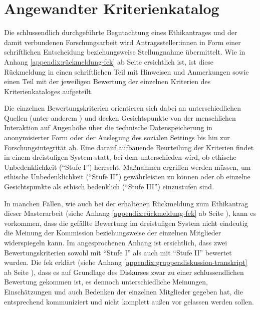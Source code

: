 \documentclass[a4paper,12pt,twoside]{scrreprt}
\begin{document}
\section{Angewandter Kriterienkatalog}
\label{sec:angewandter-kriterienkatalog}

Die schlussendlich durchgeführte Begutachtung eines Ethikantrages und der damit verbundenen Forschungsarbeit wird Antragssteller:innen in Form einer schriftlichen Entscheidung beziehungsweise Stellungnahme übermittelt. \cite[4]{forschungsethik-kommission_der_fachhochschule_vorarlberg_verfahrensordnung_2020} Wie in Anhang \ref{appendix:rückmeldung-fek} ab Seite \pageref{appendix:rückmeldung-fek} ersichtlich ist, ist diese Rückmeldung in einen schriftlichen Teil mit Hinweisen und Anmerkungen sowie einen Teil mit der jeweiligen Bewertung der einzelnen Kriterien des Kriterienkataloges aufgeteilt.

Die einzelnen Bewertungskriterien orientieren sich dabei an unterschiedlichen Quellen (unter anderem \cite{manzeschke_meestar_2015, marckmann_was_2000, schuchter_care_2018}) und decken Gesichtspunkte von der menschlichen Interaktion auf Augenhöhe über die technische Datenspeicherung in anonymisierter Form oder der Auslegung des sozialen Settings bis hin zur Forschungsintegrität ab. Eine darauf aufbauende Beurteilung der Kriterien findet in einem dreistufigen System statt, bei dem unterschieden wird, ob ethische Unbedenklichkeit (\enquote{Stufe I}) herrscht, Maßnahmen ergriffen werden müssen, um ethische Unbedenklichkeit (\enquote{Stufe II}) gewährleisten zu können oder ob einzelne Gesichtspunkte als ethisch bedenklich (\enquote{Stufe III}) einzustufen sind. \cite[1]{forschungsethik-kommission_der_fachhochschule_vorarlberg_kriterienkatalog_2021}

\medskip

In manchen Fällen, wie auch bei der erhaltenen Rückmeldung zum Ethikantrag dieser Masterarbeit (siehe Anhang \ref{appendix:rückmeldung-fek} ab Seite \pageref{appendix:rückmeldung-fek}), kann es vorkommen, dass die gefällte Bewertung im dreistufigen System nicht eindeutig die Meinung der Kommission beziehungsweise der einzelnen Mitglieder widerspiegeln kann. Im angesprochenen Anhang ist ersichtlich, dass zwei Bewertungskriterien sowohl mit \enquote{Stufe I} als auch mit \enquote{Stufe II} bewertet wurden. Die \ac{fek} erklärt (siehe Anhang \ref{appendix:gruppendiskussion-transkript} ab Seite \pageref{appendix:gruppendiskussion-transkript}), dass es auf Grundlage des Diskurses zwar zu einer schlussendlichen Bewertung gekommen ist, es dennoch unterschiedliche Meinungen, Einschätzungen und auch Bedenken der einzelnen Mitglieder gegeben hat, die entsprechend kommuniziert und nicht komplett außen vor gelassen werden sollen.
\end{document}

